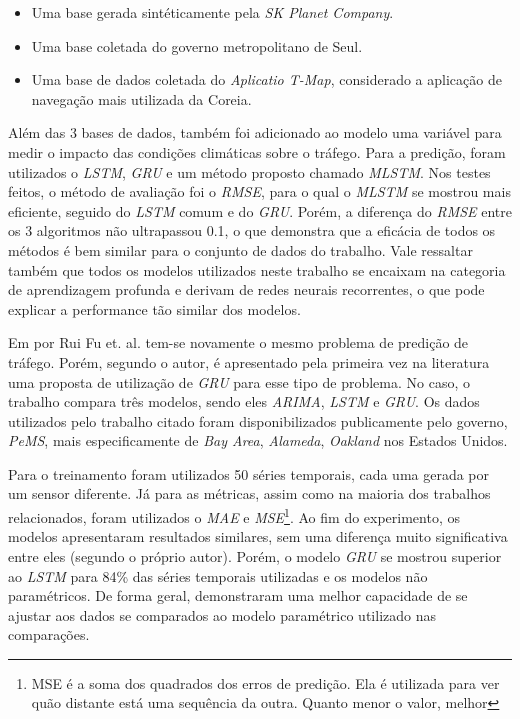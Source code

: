 \begin{itemize}
    \item Uma base gerada sintéticamente pela \textit{SK Planet Company}.
    \item Uma base coletada do governo metropolitano de Seul.
    \item Uma base de dados coletada do \textit{Aplicatio T-Map}, considerado a aplicação de navegação mais utilizada da Coreia.
\end{itemize} 

Além das 3 bases de dados, também foi adicionado ao modelo uma variável para medir o impacto das condições climáticas sobre o tráfego.
Para a predição, foram utilizados o \textit{\acrshort{LSTM}}, \textit{\acrshort{GRU}} e um método proposto chamado \textit{\acrfull{MLSTM}}. Nos testes feitos, o método de avaliação foi o \textit{\acrshort{RMSE}}, para o qual o \textit{\acrshort{MLSTM}} se mostrou mais eficiente, seguido do \textit{\acrshort{LSTM}} comum e do \textit{\acrshort{GRU}}. Porém, a diferença do \textit{\acrshort{RMSE}} entre os 3 algoritmos não ultrapassou 0.1, o que demonstra que a eficácia de todos os métodos é bem similar para o conjunto de dados do trabalho. Vale ressaltar também que todos os modelos utilizados neste trabalho se encaixam na categoria de aprendizagem profunda e derivam de redes neurais recorrentes, o que pode explicar a performance tão similar dos modelos.

Em  \cite{fu2016using} por Rui Fu et. al. tem-se novamente o mesmo problema de predição de tráfego. Porém, segundo o autor, é apresentado pela primeira vez na literatura uma proposta de utilização de \textit{\acrshort{GRU}} para esse tipo de problema. No caso, o trabalho compara três modelos, sendo eles \textit{\acrshort{ARIMA}}, \textit{\acrshort{LSTM}} e \textit{\acrshort{GRU}}. Os dados utilizados pelo trabalho citado foram disponibilizados publicamente pelo governo, \textit{PeMS}, mais especificamente de \textit{Bay Area}, \textit{Alameda}, \textit{Oakland} nos Estados Unidos. 

Para o treinamento foram utilizados 50 séries temporais, cada uma gerada por um sensor diferente. Já para as métricas, assim como na maioria dos trabalhos relacionados, foram utilizados o \textit{\acrshort{MAE}} e \textit{\acrfull{MSE}}\footnote{MSE é a soma dos quadrados dos erros de predição. Ela é utilizada para ver quão distante está uma sequência da outra. Quanto menor o valor, melhor}. Ao fim do experimento, os modelos apresentaram resultados similares, sem uma diferença muito significativa entre eles (segundo o próprio autor). Porém, o modelo \textit{\acrshort{GRU}} se mostrou superior ao \textit{\acrshort{LSTM}} para 84\% das séries temporais utilizadas e os modelos não paramétricos. De forma geral, demonstraram uma melhor capacidade de se ajustar aos dados se comparados ao modelo paramétrico utilizado nas comparações.

